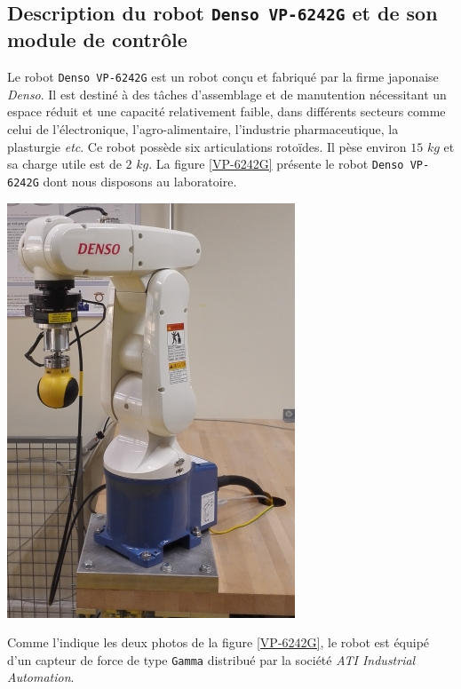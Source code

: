 \documentclass[12pt,a4paper,twoside]{report}
\begin{document}
\subsection{Description du robot \texttt{Denso VP-6242G} et de son module de contrôle}
Le robot \verb"Denso VP-6242G" est un robot conçu et fabriqué par la firme japonaise \textit{Denso}. Il est destiné à des tâches d'assemblage et de manutention nécessitant un espace réduit et une capacité relativement faible, dans différents secteurs comme celui de l'électronique, l'agro-alimentaire, l'industrie pharmaceutique, la plasturgie \emph{etc}. Ce robot possède six articulations rotoïdes. Il pèse environ $15$ $kg$ et sa charge utile est de $2$ $kg$. La figure \ref{VP-6242G} présente le robot \verb"Denso VP-6242G" dont nous disposons au laboratoire.
\begin{center}
\includegraphics[scale=0.6]{Robot_TroisQuart_Red.jpg}
\label{VP-6242G}
\end{center}
Comme l'indique les deux photos de la figure \ref{VP-6242G}, le robot est équipé d'un capteur de force de type \texttt{Gamma} distribué par la société \textit{ATI Industrial Automation}.
\end{document}
